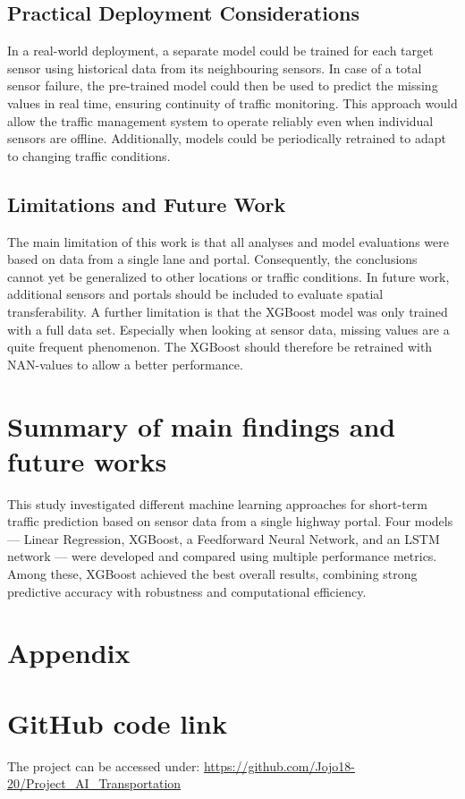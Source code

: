 	\subsection{Practical Deployment Considerations}
	In a real-world deployment, a separate model could be trained for each target sensor using historical data from its neighbouring sensors. In case of a total sensor failure, the pre-trained model could then be used to predict the missing values in real time, ensuring continuity of traffic monitoring. This approach would allow the traffic management system to operate reliably even when individual sensors are offline. Additionally, models could be periodically retrained to adapt to changing traffic conditions.
	\subsection{Limitations and Future Work}
	The main limitation of this work is that all analyses and model evaluations were based on data from a single lane and portal. Consequently, the conclusions cannot yet be generalized to other locations or traffic conditions.
	In future work, additional sensors and portals should be included to evaluate spatial transferability.  
	A further limitation is that the XGBoost model was only trained with a full data set. Especially when looking at sensor data, missing values are a quite frequent phenomenon. The XGBoost should therefore be retrained with NAN-values to allow a better performance.

	
	
	
	
	\section{Summary of main findings and future works}
	This study investigated different machine learning approaches for short-term traffic prediction based on sensor data from a single highway portal. Four models — Linear Regression, XGBoost, a Feedforward Neural Network, and an LSTM network — were developed and compared using multiple performance metrics. Among these, XGBoost achieved the best overall results, combining strong predictive accuracy with robustness and computational efficiency.
	
	
	\newpage
	\appendix
	\section*{Appendix}
	\section{GitHub code link}
	The project can be accessed under:
	\url{https://github.com/Jojo18-20/Project_AI_Transportation}
	
